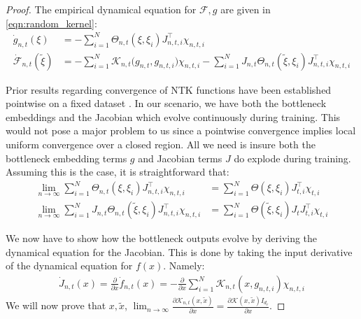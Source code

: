 \documentclass{article}
\theoremstyle{definition}
\theoremstyle{remark}
\renewcommand{\[}{\begin{eqnarray}}
\renewcommand{\]}{\end{eqnarray}}
\renewcommand{\[}{\begin{eqnarray}}
\renewcommand{\]}{\end{eqnarray}}
\newcommand{\F}{\mathcal{F}}
\begin{document}
\begin{proof}
The empirical dynamical equation for $\F,g$ are given in \cref{eqn:random_kernel}:
\begin{align}
\dot{g}_{n,t}(\xi) &= -\sum_{i=1}^N\Theta_{n,t}(\xi,\xi_i)J_{n,t,i}^\top\chi_{n,t,i}\\
\dot{\F}_{n,t}(\tilde{\xi}) &= -\sum_{i=1}^N\mathcal{K}_{n,t}\big(g_{n,t},g_{n,t,i}\big)\chi_{n,t,i} 
-\sum_{i=1}^NJ_{n,t} \Theta_{n,t}(\tilde{\xi},\xi_i)J^{\top}_{n,t,i} \chi_{n,t,i}
\end{align}

Prior results regarding convergence of NTK functions have been established pointwise on a fixed dataset \cite{yang2}. In our scenario, we have both the bottleneck embeddings and the Jacobian which evolve continuously during training. This would not pose a major problem to us since a pointwise convergence implies local uniform convergence over a closed region. All we need is insure both the bottleneck embedding terms $g$ and Jacobian terms $J$ do explode during training.
Assuming this is the case, it is straightforward that:
\begin{align}
    \lim_{n \to \infty } \sum_{i=1}^N\Theta_{n,t}(\xi,\xi_i)J_{n,t,i}^\top\chi_{n,t,i} &= \sum_{i=1}^N\Theta(\xi,\xi_i)J_{t,i}^\top\chi_{t,i}\\
    \lim_{n \to \infty}\sum_{i=1}^NJ_{n,t} \Theta_{n,t}(\tilde{\xi},\xi_i)J^{\top}_{n,t,i}\chi_{n,t,i} &= \sum_{i=1}^N \Theta(\tilde{\xi},\xi_i)J_tJ^{\top}_{t,i} \chi_{t,i} 
\end{align}

We now have to show how the bottleneck outputs evolve by deriving the dynamical equation for the Jacobian. 
This is done by taking the input derivative of the dynamical equation for $f(x)$. Namely:
\begin{align}
    \dot{J}_{n,t}(x) = \frac{\partial}{\partial x}\dot{f}_{n,t}(x) = -\frac{\partial}{\partial x}\sum_{i=1}^N\mathcal{K}_{n,t}(x,g_{n,t,i})\chi_{n,t,i} 
\end{align}
We will now prove that $x,\tilde{x}$, $\lim_{n \to \infty} \frac{\partial \mathcal{K}_{n,t}(x,\tilde{x})}{\partial x} = \frac{\partial \mathcal{K}(x,\tilde{x})I_{d_r}}{\partial x}$.


\end{proof}
\end{document}
